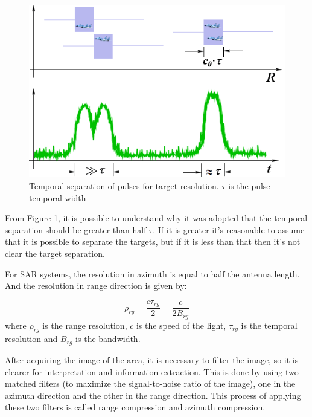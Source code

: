 \begin{figure}[H]
    \centering
    \includegraphics[width=0.8\linewidth]{Cap1/ra1_print.png}
    \caption{Temporal separation of pulses for target resolution. $\tau$ is the pulse temporal width}
    \label{fig:pulse_separation}
\end{figure}{}

From Figure \ref{fig:pulse_separation}, it is possible to understand why it was adopted that the temporal separation should be greater than half $\tau$. If it is greater it's reasonable to assume that it is possible to separate the targets, but if it is less than that then it's not clear the target separation.

For SAR systems, the resolution in azimuth is equal to half the antenna length. And the resolution in range direction is given by: 

\begin{equation}
    \rho_{rg} = \frac{c\tau_{rg}}{2} = \frac{c}{2B_{rg}}
\end{equation}
where $\rho_{rg}$ is the range resolution, $c$ is the speed of the light, $\tau_{rg}$ is the temporal resolution and $B_{rg}$ is the bandwidth.

After acquiring the image of the area, it is necessary to filter the image, so it is clearer for interpretation and information extraction. This is done by using two matched filters (to maximize the signal-to-noise ratio of the image), one in the azimuth direction and the other in the range direction. 
This process of applying these two filters is called range compression and azimuth compression.

